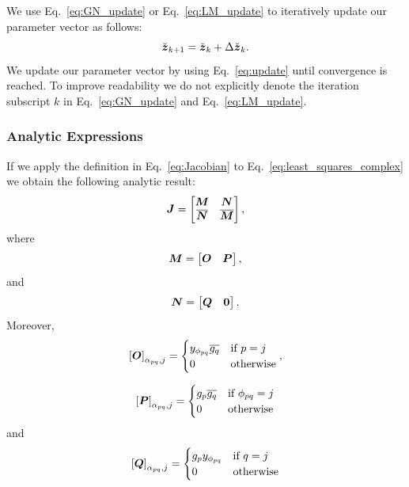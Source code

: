 \documentclass[useAMS,usenatbib]{mn2e}
\newcommand{\bz}{\bmath{z}}
\newcommand{\bJ}{\bmath{J}}
\newcommand{\bN}{\bmath{N}}
\newcommand{\bM}{\bmath{M}}
\newcommand{\bO}{\bmath{O}}
\newcommand{\bP}{\bmath{P}}
\newcommand{\bQ}{\bmath{Q}}
\newcommand{\bzero}{\bmath{0}}
\newcommand{\conj}[1]{\overline{#1}}
\begin{document}
We use Eq.~\eqref{eq:GN_update} or Eq.~\eqref{eq:LM_update} to iteratively update our 
parameter vector as follows:
\begin{equation}
\label{eq:update}
\breve{\bz}_{k+1} = \breve{\bz}_{k} + \Delta \breve{\bz}_{k}. 
\end{equation}
We update our parameter vector by using Eq.~\eqref{eq:update} until convergence is reached. To improve readability we do not explicitly denote the iteration subscript $k$ in 
Eq.~\eqref{eq:GN_update} and Eq.~\eqref{eq:LM_update}.

\subsubsection{Analytic Expressions}
\label{sec:analytic}
If we apply the definition in Eq.~\eqref{eq:Jacobian} to Eq.~\eqref{eq:least_squares_complex} we obtain the following analytic result:
\begin{equation}
\label{eq:Jacobian_red}
\bJ = \begin{bmatrix}
       \bM & \bN\\
       \conj{\bN} & \conj{\bM}
      \end{bmatrix},
\end{equation}
where
\begin{equation}
\bM =\begin{bmatrix}
      \bO & \bP
     \end{bmatrix},
\end{equation}
and 
\begin{equation}
\bN = \begin{bmatrix}
       \bQ & \bzero
      \end{bmatrix}.
\end{equation}
Moreover,
\begin{equation}
\left [ \bO  \right ]_{\alpha_{pq},j} = \begin{cases}
                                         y_{\phi_{pq}}\conj{g_q} & \textrm{if}~p=j\\
                                         0  & \textrm{otherwise} 
                                        \end{cases},
\end{equation}

\begin{equation}
\left [ \bP  \right ]_{\alpha_{pq},j} = \begin{cases}
                                         g_p\conj{g_q} & \textrm{if}~\phi_{pq}=j\\
                                         0  & \textrm{otherwise} 
                                        \end{cases}
\end{equation}
and
\begin{equation}
\left [ \bQ  \right ]_{\alpha_{pq},j} = \begin{cases}
                                         g_py_{\phi_{pq}} & \textrm{if}~q=j\\
                                         0  & \textrm{otherwise} 
                                        \end{cases}
\end{equation}
\end{document}

